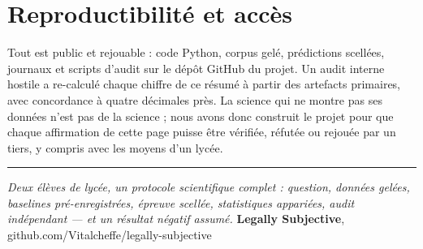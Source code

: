 \documentclass[11pt,a4paper]{article}
\begin{document}
\section*{Reproductibilité et accès}

Tout est public et rejouable : code Python, corpus gelé, prédictions
scellées, journaux et scripts d'audit sur le dépôt GitHub du projet. Un
audit interne hostile a re-calculé chaque chiffre de ce résumé à partir
des artefacts primaires, avec concordance à quatre décimales près. La
science qui ne montre pas ses données n'est pas de la science ; nous avons
donc construit le projet pour que chaque affirmation de cette page puisse
être vérifiée, réfutée ou rejouée par un tiers, y compris avec les moyens
d'un lycée.

\begin{center}
\rule{0.28\linewidth}{0.6pt}
\end{center}
\vspace{4pt}

\begin{center}
{\small \emph{Deux élèves de lycée, un protocole scientifique complet :
question, données gelées, baselines pré-enregistrées, épreuve scellée,
statistiques appariées, audit indépendant --- et un résultat négatif
assumé.} \textbf{Legally Subjective}, github.com/Vitalcheffe/legally-subjective\par}
\end{center}
\end{document}
